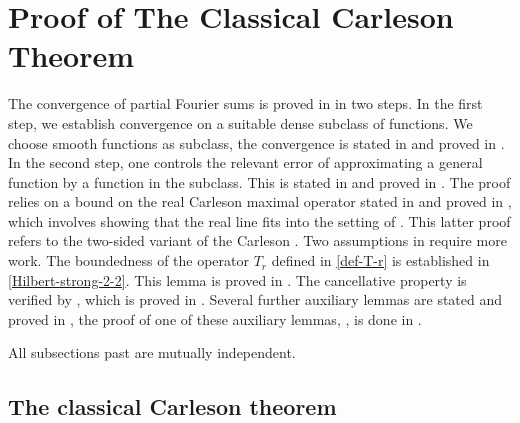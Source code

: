 \chapter{Proof of The Classical Carleson Theorem}

The convergence of partial Fourier sums is proved in
 in two steps. In the first step,
we establish convergence on a suitable dense subclass of functions. We choose smooth functions as subclass, the convergence is stated in  and proved in .
In the second step, one controls the relevant error of approximating a general function by a function in
the subclass. This is stated in  and proved
in .
The proof relies on a bound on the real Carleson maximal operator stated in  and proved in , which involves showing that the real line fits into the setting of .
This latter proof refers to the two-sided variant of the Carleson . Two assumptions in  require more work. The boundedness of the operator $T_r$ defined in \eqref{def-T-r} is established in \ref{Hilbert-strong-2-2}. This lemma is proved in .
The cancellative property is verified by , which is proved in .
Several further auxiliary lemmas are stated and proved in , the proof of one of these auxiliary lemmas, , is done in .

All subsections past  are mutually independent.



\section{The classical Carleson theorem}
\label{10classical}

